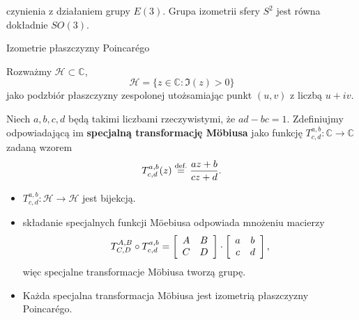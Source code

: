 czynienia z działaniem grupy $E(3)$. Grupa izometrii sfery $S^2$ jest równa 
dokładnie $SO(3)$. 
\begin{frame}{Izometrie płaszczyzny Poincar\'ego}

 Rozważmy $\mathcal{H}\subset \mathbb{C}$, \[\mathcal{H}=\{z\in \mathbb{C}\colon \Im(z)>0\}\]jako podzbiór płaszczyzny zespolonej utożsamiając punkt $(u,v)$ z liczbą $u+iv$. 

\pause\begin{definicja}
Niech $a,b,c,d$ będą takimi liczbami rzeczywistymi, że $ad-bc=1$. Zdefiniujmy odpowiadającą im \textbf{specjalną transformację M\"obiusa} jako funkcję 
$T^{a,b}_{c,d}\colon \mathbb{C}\to\mathbb{C}$ zadaną wzorem
\[T^{a,b}_{c,d}(z)\define \frac{az+b}{cz+d}.\]
\end{definicja}

\end{frame}
\begin{frame}[<+->]

\begin{twierdzenie}
\begin{itemize}
\item $T^{a,b}_{c,d}\colon \mathcal{H}\to\mathcal{H}$ jest bijekcją.
\item składanie specjalnych funkcji M\"oebiusa odpowiada mnożeniu macierzy 
\[T^{A,B}_{C,D}\circ T^{a,b}_{c,d}=
\left[\begin{array}{cc}
     A&B\\
	C&D
     \end{array}
\right]\cdot
\left[\begin{array}{cc}
     a&b\\
	c&d
     \end{array}
\right],\] więc specjalne transformacje M\"obiusa tworzą grupę.
\item Każda specjalna transformacja M\"obiusa jest izometrią płaszczyzny Poincar\'ego.
\end{itemize}
\end{twierdzenie}

\end{frame}
